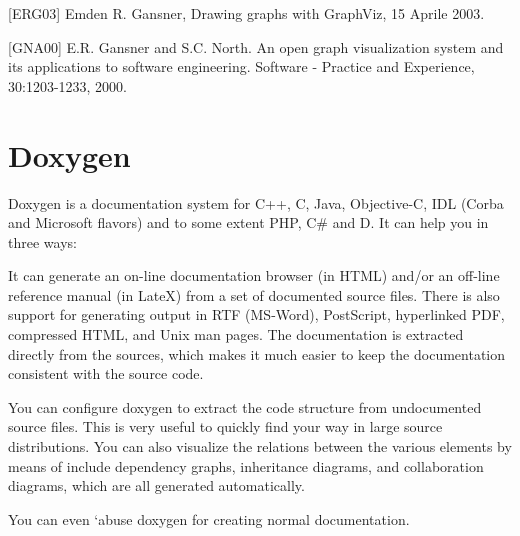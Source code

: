 \begin{DoxyItemize}
\item \mbox{[}E\+R\+G03\mbox{]} Emden R. Gansner, Drawing graphs with Graph\+Viz, 15 Aprile 2003.
\item \mbox{[}G\+N\+A00\mbox{]} E.\+R. Gansner and S.\+C. North. An open graph visualization system and its applications to software engineering. Software -\/ Practice and Experience, 30\+:1203-\/1233, 2000.
\end{DoxyItemize}\hypertarget{panda_sdk_doxygen_tag}{}\section{Doxygen}\label{panda_sdk_doxygen_tag}
{\ttfamily Doxygen} is a documentation system for C++, C, Java, Objective-\/C, I\+DL (Corba and Microsoft flavors) and to some extent P\+HP, C\# and D. It can help you in three ways\+:
\begin{DoxyItemize}
\item It can generate an on-\/line documentation browser (in H\+T\+ML) and/or an off-\/line reference manual (in LateX) from a set of documented source files. There is also support for generating output in R\+TF (M\+S-\/\+Word), Post\+Script, hyperlinked P\+DF, compressed H\+T\+ML, and Unix man pages. The documentation is extracted directly from the sources, which makes it much easier to keep the documentation consistent with the source code.
\item You can configure {\ttfamily doxygen} to extract the code structure from undocumented source files. This is very useful to quickly find your way in large source distributions. You can also visualize the relations between the various elements by means of include dependency graphs, inheritance diagrams, and collaboration diagrams, which are all generated automatically.
\item You can even `abuse\textquotesingle{} {\ttfamily doxygen} for creating normal documentation.
\end{DoxyItemize}

